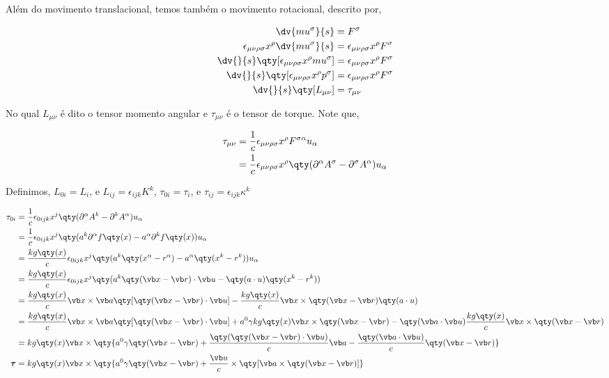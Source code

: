 \documentclass[twoside]{amsart}
\numberwithin{equation}{section}
\begin{document}
Além do movimento translacional, temos também o movimento rotacional, descrito por,

\begin{align}
    \dv{mu^\sigma}{s}&=F^\sigma\\
    \epsilon_{\mu\nu\rho\sigma}x^\rho\dv{mu^\sigma}{s}&=\epsilon_{\mu\nu\rho\sigma}x^\rho F^\sigma\\
    \dv{}{s}\qty[\epsilon_{\mu\nu\rho\sigma}x^\rho mu^\sigma]&=\epsilon_{\mu\nu\rho\sigma}x^\rho F^\sigma\\
    \dv{}{s}\qty[\epsilon_{\mu\nu\rho\sigma}x^\rho p^\sigma]&=\epsilon_{\mu\nu\rho\sigma}x^\rho F^\sigma\\
    \dv{}{s}\qty[L_{\mu\nu}]&=\tau_{\mu\nu}
\end{align}

No qual $L_{\mu\nu}$ é dito o tensor momento angular e $\tau_{\mu\nu}$ é o tensor de torque. Note que,

\begin{align}
    \tau_{\mu\nu}&=\frac1c\epsilon_{\mu\nu\rho\sigma}x^\rho F^{\sigma\alpha}u_\alpha\\
    &=\frac1c\epsilon_{\mu\nu\rho\sigma}x^\rho\qty(\partial^\alpha A^\sigma-\partial^\sigma A^\alpha)u_\alpha
\end{align}

Definimos, $L_{0i}=L_i$, e $L_{ij}=\epsilon_{ijk}K^k$, $\tau_{0i}=\tau_i$, e $\tau_{ij}=\epsilon_{ijk}\kappa^k$ 

\begin{align}
    \tau_{0i}&=\frac1c\epsilon_{0ijk}x^j\qty(\partial^\alpha A^k-\partial^k A^\alpha)u_\alpha\\
    &=\frac1c\epsilon_{0ijk}x^j\qty(a^k\partial^\alpha f\qty(x)-a^\alpha\partial^k f\qty(x))u_\alpha\\
    &=\frac{kg\qty(x)}{c}\epsilon_{0ijk}x^j\qty(a^k\qty(x^\alpha-r^\alpha)-a^\alpha\qty(x^k-r^k))u_\alpha\\
    &=\frac{kg\qty(x)}{c}\epsilon_{0ijk}x^j\qty(a^k\qty(\vb x-\vb r)\cdot \vb u-\qty(a\cdot u)\qty(x^k-r^k))\\
    &=\frac{kg\qty(x)}{c}\vb x\times \vb a \qty[\qty(\vb x-\vb r)\cdot \vb u]-\frac{kg\qty(x)}{c}\vb x\times\qty(\vb x-\vb r)\qty(a\cdot u)\\
    &=\frac{kg\qty(x)}{c}\vb x\times \vb a \qty[\qty(\vb x-\vb r)\cdot \vb u]+a^0\gamma kg\qty(x)\vb x\times\qty(\vb x-\vb r)-\qty(\vb a\cdot \vb u)\frac{kg\qty(x)}{c}\vb x\times \qty(\vb x-\vb r)\\
    &=kg\qty(x)\vb x\times\qty{a^0\gamma\qty(\vb x-\vb r)+\frac{\qty(\qty(\vb x-\vb r)\cdot \vb u)}{c}\vb a-\frac{\qty(\vb a\cdot \vb u)}{c}\qty(\vb x -\vb r)}\\
    \boldsymbol \tau&=kg\qty(x)\vb x\times\qty{a^0\gamma\qty(\vb x-\vb r)+\frac{\vb u}{c}\times \qty[\vb a\times\qty(\vb x-\vb r)]}
\end{align}
\end{document}

